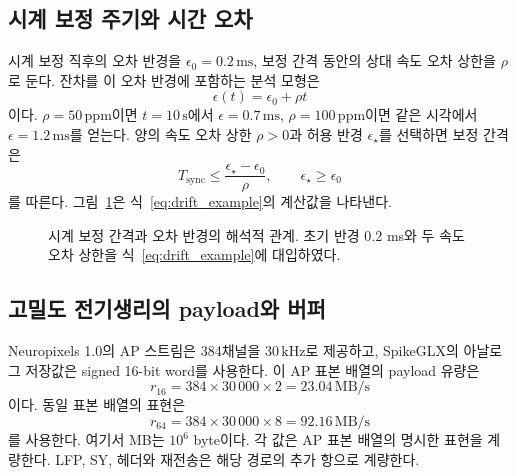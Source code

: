 \subsection{시계 보정 주기와 시간 오차}
시계 보정 직후의 오차 반경을 $\epsilon_0=0.2\,\mathrm{ms}$,
보정 간격 동안의 상대 속도 오차 상한을 $\rho$로 둔다.
잔차를 이 오차 반경에 포함하는 분석 모형은
\begin{equation}
 \epsilon(t)=\epsilon_0+\rho t
 \label{eq:drift_example}
\end{equation}
이다. $\rho=50\,\mathrm{ppm}$이면 $t=10\,\mathrm{s}$에서 $\epsilon=0.7\,\mathrm{ms}$,
$\rho=100\,\mathrm{ppm}$이면 같은 시각에서 $\epsilon=1.2\,\mathrm{ms}$를 얻는다.
양의 속도 오차 상한 $\rho>0$과 허용 반경 $\epsilon_\star$를 선택하면 보정 간격은
\begin{equation}
 T_{\mathrm{sync}}\le\frac{\epsilon_\star-\epsilon_0}{\rho},
 \qquad \epsilon_\star\ge\epsilon_0
\end{equation}
를 따른다. 그림~\ref{fig:clock}은 식~\eqref{eq:drift_example}의 계산값을 나타낸다.

\begin{figure}[tb]
\centering
{}
\caption{시계 보정 간격과 오차 반경의 해석적 관계. 초기 반경 0.2 ms와 두 속도 오차 상한을 식~\eqref{eq:drift_example}에 대입하였다.}
\label{fig:clock}
\end{figure}

\subsection{고밀도 전기생리의 payload와 버퍼}
Neuropixels 1.0의 AP 스트림은 384채널을 $30\,\mathrm{kHz}$로 제공하고,
SpikeGLX의 아날로그 저장값은 signed 16-bit word를 사용한다\cite{neuropixels,spikeglx_metadata}.
이 AP 표본 배열의 payload 유량은
\begin{equation}
 r_{16}=384\times30\,000\times2=23.04\,\mathrm{MB/s}
\end{equation}
이다. 동일 표본 배열의  표현은
\begin{equation}
 r_{64}=384\times30\,000\times8=92.16\,\mathrm{MB/s}
\end{equation}
를 사용한다. 여기서 MB는 $10^6$ byte이다. 각 값은 AP 표본 배열의 명시한 표현을 계량한다.
LFP, SY, 헤더와 재전송은 해당 경로의 추가 항으로 계량한다.

